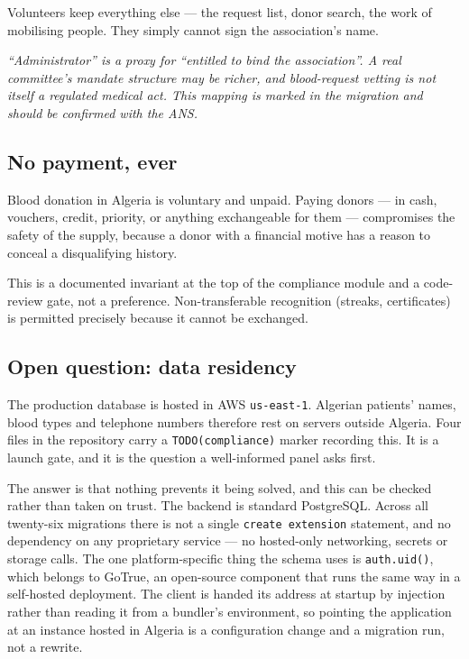 \documentclass[11pt,a4paper]{article}
\newcommand{\note}[1]{{\small\color{qatraGrey}\textit{#1}}}
\begin{document}
Volunteers keep everything else — the request list, donor search, the work of
mobilising people. They simply cannot sign the association's name.

\note{``Administrator'' is a proxy for ``entitled to bind the association''. A
real committee's mandate structure may be richer, and blood-request vetting is
not itself a regulated medical act. This mapping is marked in the migration and
should be confirmed with the ANS.}

\subsection{No payment, ever}

Blood donation in Algeria is voluntary and unpaid. Paying donors — in cash,
vouchers, credit, priority, or anything exchangeable for them — compromises the
safety of the supply, because a donor with a financial motive has a reason to
conceal a disqualifying history.

This is a documented invariant at the top of the compliance module and a
code-review gate, not a preference. Non-transferable recognition (streaks,
certificates) is permitted precisely because it cannot be exchanged.

\subsection{Open question: data residency}\label{sec:residency}

The production database is hosted in AWS \texttt{us-east-1}. Algerian patients'
names, blood types and telephone numbers therefore rest on servers outside
Algeria. Four files in the repository carry a \texttt{TODO(compliance)} marker
recording this. It is a launch gate, and it is the question a well-informed
panel asks first.

The answer is that nothing prevents it being solved, and this can be checked
rather than taken on trust. The backend is standard PostgreSQL. Across all
twenty-six migrations there is not a single \texttt{create extension}
statement, and no dependency on any proprietary service --- no hosted-only
networking, secrets or storage calls. The one platform-specific thing the
schema uses is \texttt{auth.uid()}, which belongs to GoTrue, an open-source
component that runs the same way in a self-hosted deployment. The client is
handed its address at startup by injection rather than reading it from a
bundler's environment, so pointing the application at an instance hosted in
Algeria is a configuration change and a migration run, not a rewrite.
\end{document}
